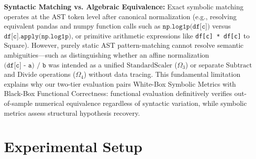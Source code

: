 \documentclass[sigconf]{acmart}
\begin{document}
\noindent\textbf{Syntactic Matching vs. Algebraic Equivalence:} Exact symbolic matching operates at the AST token level after canonical normalization (e.g., resolving equivalent pandas and numpy function calls such as $\texttt{np.log1p(df[c])}$ versus $\texttt{df[c].apply(np.log1p)}$, or primitive arithmetic expressions like \texttt{df[c] * df[c]} to $\text{Square}$). However, purely static AST pattern-matching cannot resolve semantic ambiguities—such as distinguishing whether an affine normalization $\texttt{(df[c] - a) / b}$ was intended as a unified $\text{StandardScaler}$ ($\Omega_3$) or separate $\text{Subtract}$ and $\text{Divide}$ operations ($\Omega_4$) without data tracing. This fundamental limitation explains why our two-tier evaluation pairs White-Box Symbolic Metrics with Black-Box Functional Correctness: functional evaluation definitively verifies out-of-sample numerical equivalence regardless of syntactic variation, while symbolic metrics assess structural hypothesis recovery.

\section{Experimental Setup}
\label{sec:exp_setup}
\end{document}
